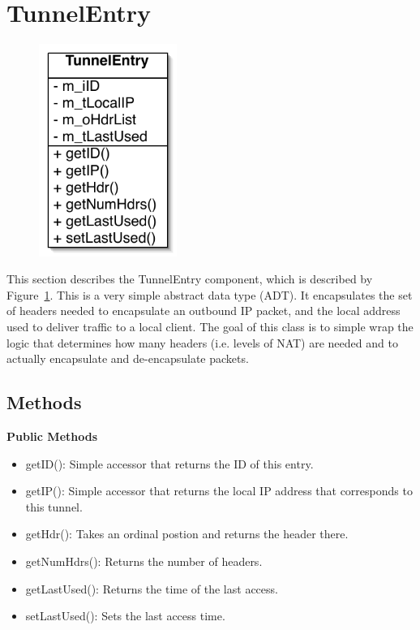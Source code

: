 \section{TunnelEntry}\label{sec:tunent}

\begin{figure}
\begin{center}
\includegraphics[width=0.4\textwidth]{figs/tunent}
\end{center}
\caption{}
\label{fig:tunent}
\end{figure}

This section describes the TunnelEntry component, which is described by Figure~\ref{fig:tunent}.  This is a very simple abstract data type
(ADT).  It encapsulates the set of headers needed to encapsulate an outbound IP packet, and the local address used to deliver traffic to a
local client.  The goal of this class is to simple wrap the logic that determines how many headers (i.e. levels of NAT) are needed and to
actually encapsulate and de-encapsulate packets.


\subsection{Methods}

{\bf Public Methods}
\begin{itemize}
\item getID(): Simple accessor that returns the ID of this entry.
\item getIP(): Simple accessor that returns the local IP address that corresponds to this tunnel.
\item getHdr(): Takes an ordinal postion and returns the header there.
\item getNumHdrs(): Returns the number of headers.
\item getLastUsed(): Returns the time of the last access.
\item setLastUsed(): Sets the last access time.
\end{itemize}

